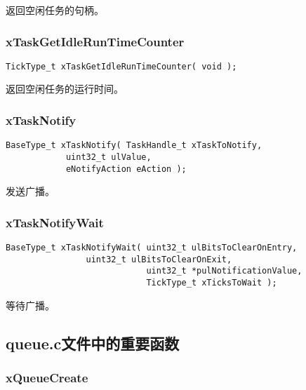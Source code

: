 \documentclass[12pt, a4paper]{article}
\begin{document}
返回空闲任务的句柄。

\subsubsection {xTaskGetIdleRunTimeCounter}

\begin{lstlisting}[language={[ANSI]C},keywordstyle=\color{blue!70},commentstyle=\color{red!50!green!50!blue!50},frame=shadowbox, rulesepcolor=\color{red!20!green!20!blue!20}]
TickType_t xTaskGetIdleRunTimeCounter( void );
\end{lstlisting}

返回空闲任务的运行时间。

\subsubsection {xTaskNotify}

\begin{lstlisting}[language={[ANSI]C},keywordstyle=\color{blue!70},commentstyle=\color{red!50!green!50!blue!50},frame=shadowbox, rulesepcolor=\color{red!20!green!20!blue!20}]
BaseType_t xTaskNotify( TaskHandle_t xTaskToNotify, 
			uint32_t ulValue, 
			eNotifyAction eAction );
\end{lstlisting}

发送广播。

\subsubsection {xTaskNotifyWait}
\begin{lstlisting}[language={[ANSI]C},keywordstyle=\color{blue!70},commentstyle=\color{red!50!green!50!blue!50},frame=shadowbox, rulesepcolor=\color{red!20!green!20!blue!20}]
BaseType_t xTaskNotifyWait( uint32_t ulBitsToClearOnEntry, 
			    uint32_t ulBitsToClearOnExit, 
                            uint32_t *pulNotificationValue, 
                            TickType_t xTicksToWait );
\end{lstlisting}

等待广播。



\subsection {queue.c文件中的重要函数}

\subsubsection {xQueueCreate}
\end{document}
